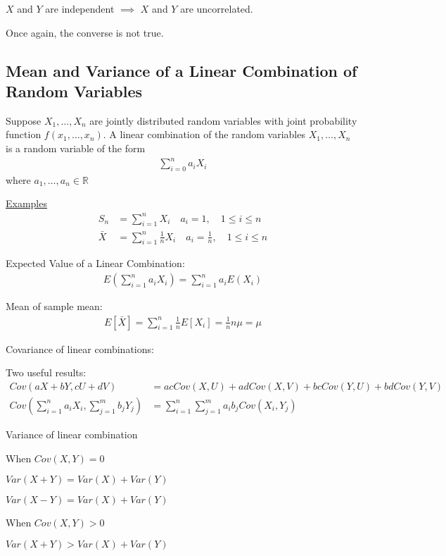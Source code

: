 \documentclass{article}
\begin{document}
$X$ and $Y$ are independent $\implies$ $X$ and $Y$ are uncorrelated. 

Once again, the converse is not true. 

\subsection{Mean and Variance of a Linear Combination of Random Variables}

Suppose $X_1, \ldots, X_n$ are jointly distributed random variables with joint probability function $f(x_1, \ldots, x_n)$. A linear combination of the random variables $X_1, \ldots, X_n$ is a random variable of the form
\begin{align*}
    \sum_{i=0}^n a_i X_i
\end{align*}
where $a_1, \ldots, a_n \in \mathbb{R}$

\underline{Examples}
\begin{align*}
    S_n &= \sum_{i=1}^nX_i \quad a_i = 1, \quad 1 \le i \le n \\
    \bar{X} &= \sum_{i=1}^n \frac{1}{n}X_i \quad a_i = \frac{1}{n}, \quad 1 \le i \le n
\end{align*}

Expected Value of a Linear Combination:
\begin{align*}
    E\left(\sum_{i=1}^n a_iX_i \right ) = \sum_{i=1}^n a_i E(X_i)
\end{align*}

Mean of sample mean:
\begin{align*}
    E[\bar{X}] = \sum_{i=1}^n \frac{1}{n}E[X_i] = \frac{1}{n}n \mu = \mu
\end{align*}

Covariance of linear combinations:

Two useful results:
\begin{align*}
    Cov(aX + bY, cU + dV) &= acCov(X,U) + adCov(X,V) + bcCov(Y,U) + bdCov(Y,V) \\
    Cov\left (\sum_{i=1}^n a_i X_i, \sum_{j=1}^m b_j Y_j \right ) &= \sum_{i=1}^n \sum_{j=1}^m a_ib_j Cov(X_i, Y_j)
\end{align*}

Variance of linear combination

When $Cov(X,Y) = 0$ 

$Var(X + Y) = Var(X) + Var(Y)$

$Var(X - Y) = Var(X) + Var(Y)$ 


When $Cov(X,Y) > 0$

$Var(X + Y) > Var(X) + Var(Y)$ 
\end{document}

